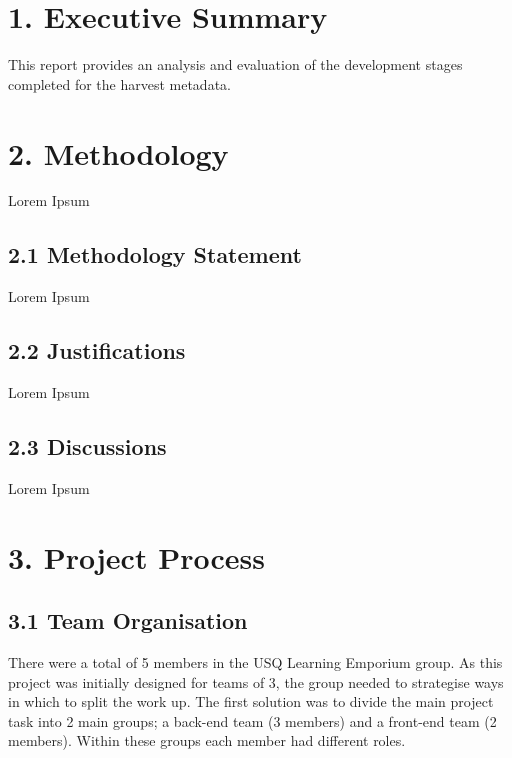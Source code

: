 \documentclass[11pt]{article}
\begin{document}
\newpage





\tableofcontents
\newpage






\setcounter{secnumdepth}{0}

\section{1. Executive Summary}
This report provides an analysis and evaluation of the development stages completed for the harvest metadata.



\section{2. Methodology}
Lorem Ipsum

\subsection{2.1 Methodology Statement}
Lorem Ipsum

\subsection{2.2 Justifications}
Lorem Ipsum

\subsection{2.3 Discussions}
Lorem Ipsum



\section{3. Project Process}

\subsection{3.1 Team Organisation}
There were a total of 5 members in the USQ Learning Emporium group. As this project was initially designed for teams of 3, the group needed to strategise ways in which to split the work up. The first solution was to divide the main project task into 2 main groups; a back-end team (3 members) and a front-end team (2 members). Within these groups each member had different roles.
\end{document}
